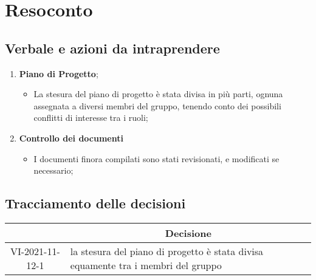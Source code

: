 \section{Resoconto}
\subsection{Verbale e azioni da intraprendere}

\begin{enumerate}
	\item \textbf{Piano di Progetto};
	\begin{itemize}
		\item La stesura del piano di progetto è stata divisa in più parti, ognuna assegnata a diversi membri del gruppo, tenendo conto dei possibili conflitti di interesse tra i ruoli;
	\end{itemize}
	\item \textbf{Controllo dei documenti}
	\begin{itemize}
		\item I documenti finora compilati sono stati revisionati, e modificati se necessario;
	\end{itemize}
\end{enumerate}

\pagebreak

\subsection{Tracciamento delle decisioni}

\begin{table}[H]
	\centering
	\renewcommand{\arraystretch}{1.8}
	\begin{tabular}{c | p{10cm}}
		\rowcolor[HTML]{125E28}
		\multicolumn{1}{c}{\color[HTML]{FFFFFF} \textbf{ID}} &
		\multicolumn{1}{c}{\color[HTML]{FFFFFF} \textbf{Decisione}} \\
		\hline
		VI-2021-11-12-1 & la stesura del piano di progetto è stata divisa equamente tra i membri del gruppo  \\ \hline
	\end{tabular}
\end{table}